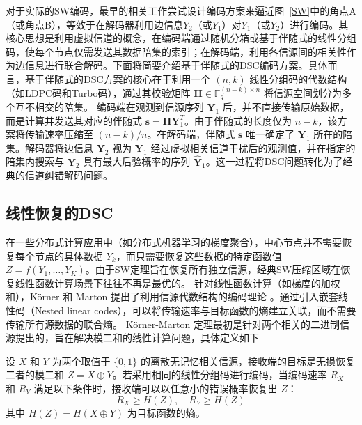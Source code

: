 对于实际的SW编码，最早的相关工作尝试设计编码方案来逼近图~\ref{SW}中的角点A（或角点B），等效于在解码器利用边信息$Y_2$（或$Y_1$）对$Y_1$（或$Y_2$）进行编码。其核心思想是利用虚拟信道的概念，在编码端通过随机分箱或基于伴随式的线性分组码，使每个节点仅需发送其数据陪集的索引；在解码端，利用各信源间的相关性作为边信息进行联合解码。下面将简要介绍基于伴随式的DSC编码方案。具体而言，基于伴随式的DSC方案的核心在于利用一个 $(n, k)$ 线性分组码的代数结构（如LDPC码和Turbo码），通过其校验矩阵 $\mathbf{H} \in \mathbb{F}_q^{(n-k) \times n}$ 将信源空间划分为多个互不相交的陪集。
编码端在观测到信源序列 $\mathbf{Y}_1$ 后，并不直接传输原始数据，而是计算并发送其对应的伴随式 $\mathbf{s} = \mathbf{H}\mathbf{Y}_1^T$。由于伴随式的长度仅为 $n-k$，该方案将传输速率压缩至 $(n-k)/n$。在解码端，伴随式 $\mathbf{s}$ 唯一确定了 $\mathbf{Y}_1$ 所在的陪集。解码器将边信息 $\mathbf{Y}_2$ 视为 $\mathbf{Y}_1$ 经过虚拟相关信道干扰后的观测值，并在指定的陪集内搜索与 $\mathbf{Y}_2$ 具有最大后验概率的序列 $\mathbf{\hat{Y}}_1$。这一过程将DSC问题转化为了经典的信道纠错解码问题。

\subsection{线性恢复的DSC}

在一些分布式计算应用中（如分布式机器学习的梯度聚合），中心节点并不需要恢复每个节点的具体数据 $Y_k$，而只需要恢复这些数据的特定函数值 $Z = f(Y_1, \dots, Y_K)$。由于SW定理旨在恢复所有独立信源，经典SW压缩区域在恢复线性函数计算场景下往往不再是最优的。
针对线性函数计算（如梯度的加权和），Körner 和 Marton 提出了利用信源代数结构的编码理论 。通过引入嵌套线性码（Nested linear codes），可以将传输速率与目标函数的熵建立关联，而不需要传输所有源数据的联合熵。
Körner-Marton 定理最初是针对两个相关的二进制信源提出的，旨在解决模二和的线性计算问题，具体定义如下
\begin{theorem}
	设 $X$ 和 $Y$ 为两个取值于 $\{0, 1\}$ 的离散无记忆相关信源，接收端的目标是无损恢复二者的模二和 $Z = X \oplus Y$。若采用相同的线性分组码进行编码，当编码速率 $R_X$ 和 $R_Y$ 满足以下条件时，接收端可以以任意小的错误概率恢复出 $Z$：
	\begin{equation}
		R_X \geq H(Z), \quad R_Y \geq H(Z)
	\end{equation}
	其中 $H(Z) = H(X \oplus Y)$ 为目标函数的熵。
\end{theorem}

